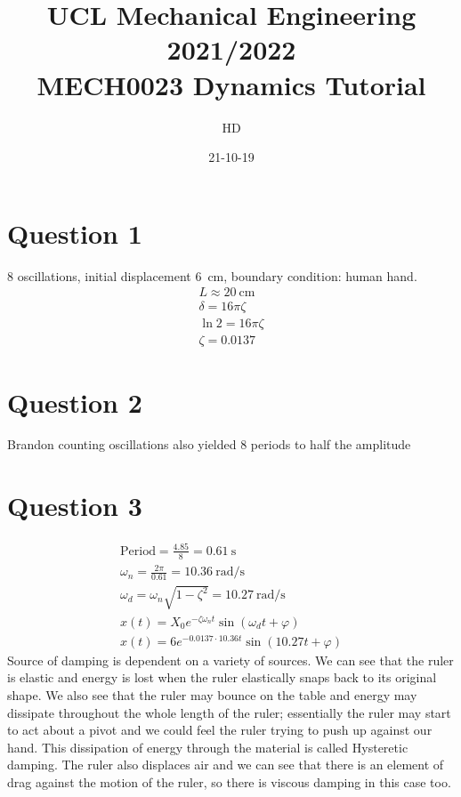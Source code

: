 \documentclass[11pt]{article}
\begin{document}
\title{\textbf{UCL Mechanical Engineering 2021/2022}\\MECH0023 Dynamics Tutorial}
\author{HD}
\date{21-10-19}
\maketitle
\section*{Question 1}
8 oscillations, initial displacement \SI{6}{\centi\meter}, boundary condition: human hand.
\begin{gather}
    L \approx \SI{20}{\centi\meter}\\
    \delta = 16\pi \zeta\\
    \ln 2 = 16\pi\zeta\\
    \zeta = 0.0137
\end{gather}
\section*{Question 2}
Brandon counting oscillations also yielded 8 periods to half the amplitude
\section*{Question 3}
\begin{gather}
    \textrm{Period} = \frac{4.85}{8} = \SI{0.61}{\second}\\
    \omega_n = \frac{2\pi}{0.61} = \SI{10.36}{\radian \per \second}\\
    \omega_d = \omega_n \sqrt{1-\zeta^2} = \SI{10.27}{\radian \per \second}\\
    x(t) = X_0 e^{-\zeta \omega_n t}\sin\left(\omega_d t + \varphi\right)\\
    x(t) = 6 e^{-0.0137 \cdot 10.36 t}\sin\left(10.27 t + \varphi\right)
\end{gather}
Source of damping is dependent on a variety of sources. We can see that the ruler is elastic and energy is lost when the ruler elastically snaps back to its original shape. We also see that the ruler may bounce on the table and energy may dissipate throughout the whole length of the ruler; essentially the ruler may start to act about a pivot and we could feel the ruler trying to push up against our hand. This dissipation of energy through the material is called Hysteretic damping. The ruler also displaces air and we can see that there is an element of drag against the motion of the ruler, so there is viscous damping in this case too.
\end{document}
